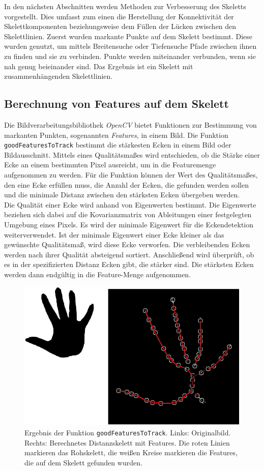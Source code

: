 In den nächsten Abschnitten werden Methoden zur Verbesserung des Skeletts vorgestellt. Dies umfasst zum einen die Herstellung der Konnektivität der Skelettkomponenten beziehungsweise dem Füllen der Lücken zwischen den Skelettlinien. Zuerst wurden markante Punkte auf dem Skelett bestimmt. Diese wurden
genutzt, um mittels Breitensuche oder Tiefensuche Pfade zwischen ihnen zu finden und sie zu verbinden. Punkte werden miteinander
verbunden, wenn sie nah genug beieinander sind. Das Ergebnis ist ein Skelett mit
zusammenhängenden Skelettlinien. 
\subsection{Berechnung von Features auf dem Skelett}
\label{subsec:features}
Die Bildverarbeitungsbibliothek \emph{OpenCV} bietet Funktionen zur Bestimmung von markanten Punkten, sogenannten \emph{Features},
in einem Bild. Die Funktion \texttt{goodFeaturesToTrack} \cite{goodfeatures} bestimmt die stärkesten Ecken in einem Bild oder Bildausschnitt. Mittels eines Qualitätsmaßes wird entschieden, ob die Stärke einer
Ecke an einem bestimmten Pixel ausreicht, um in die Featuremenge aufgenommen zu werden. Für die
Funktion können der Wert des Qualitätsmaßes, den eine Ecke erfüllen muss, die Anzahl der Ecken, die gefunden werden sollen und die
minimale Distanz zwischen den stärksten Ecken übergeben werden.\\
Die Qualität einer Ecke wird anhand von Eigenwerten bestimmt. Die Eigenwerte beziehen sich dabei auf 
die Kovarianzmatrix von Ableitungen einer festgelegten Umgebung eines Pixels. Es wird der minimale Eigenwert
für die Eckendetektion weiterverwendet. Ist der minimale Eigenwert einer Ecke kleiner als das gewünschte
Qualitätsmaß, wird diese Ecke verworfen. Die verbleibenden Ecken werden nach ihrer Qualität absteigend sortiert. Anschließend wird überprüft, ob es in der spezifizierten Distanz Ecken gibt, die stärker sind. Die
stärksten Ecken werden dann endgültig in die Feature-Menge aufgenommen. 
\begin{figure}[htbp]
\centering
\includegraphics[width=0.7\linewidth]{./fig/features.pdf}
\caption{Ergebnis der Funktion \texttt{goodFeaturesToTrack}. Links: Originalbild. Rechts: Berechnetes Distanzskelett mit Features. Die roten Linien markieren das Rohskelett, die weißen Kreise markieren die Features, die auf dem Skelett gefunden wurden.}
\label{fig:features}
\end{figure}
